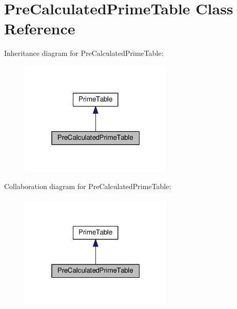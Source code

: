 \hypertarget{classPreCalculatedPrimeTable}{}\section{Pre\+Calculated\+Prime\+Table Class Reference}
\label{classPreCalculatedPrimeTable}


Inheritance diagram for Pre\+Calculated\+Prime\+Table\+:\nopagebreak
\begin{figure}[H]
\begin{center}
\leavevmode
\includegraphics[width=208pt]{classPreCalculatedPrimeTable__inherit__graph}
\end{center}
\end{figure}


Collaboration diagram for Pre\+Calculated\+Prime\+Table\+:\nopagebreak
\begin{figure}[H]
\begin{center}
\leavevmode
\includegraphics[width=208pt]{classPreCalculatedPrimeTable__coll__graph}
\end{center}
\end{figure}
